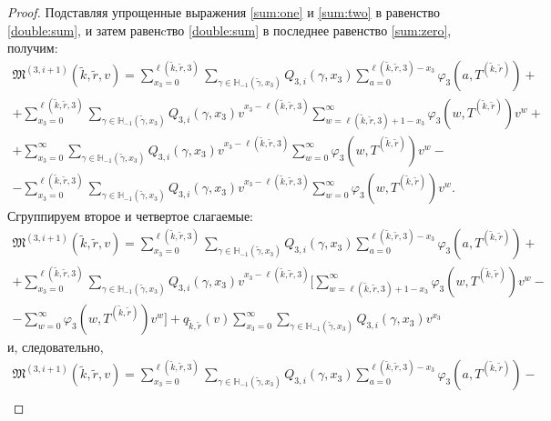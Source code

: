 \documentclass{report}
\begin{document}
\begin{proof}
Подставляя упрощенные выражения \eqref{sum:one} и \eqref{sum:two} в равенство \eqref{double:sum}, и затем равенcтво \eqref{double:sum} в последнее равенство  \eqref{sum:zero}, получим:
\begin{multline*}
\mathfrak{M}^{(3,i+1)}(\tilde{k},\tilde{r},v) = \sum_{x_3=0}^{\ell(\tilde{k},\tilde{r},3)}\sum_{\gamma \in {\mathbb H}_{-1}(\tilde{\gamma},x_3)} Q_{3,i}(\gamma,x_3) \sum_{a=0}^{\ell(\tilde{k},\tilde{r},3) - x_3} \varphi_3(a,T^{(\tilde{k},\tilde{r})}) + \\
+ \sum_{x_3=0}^{\ell(\tilde{k},\tilde{r},3)}  \sum_{\gamma \in {\mathbb H}_{-1}(\tilde{\gamma},x_3)} Q_{3,i}(\gamma,x_3) v^{x_3-\ell(\tilde{k},\tilde{r},3)}  \sum_{w=\ell(\tilde{k},\tilde{r},3) + 1 -x_3}^{\infty}
\varphi_3(w,T^{(\tilde{k},\tilde{r})}) v^w + \\
+ \sum_{x_3=0}^{\infty} \sum_{\gamma \in {\mathbb H}_{-1}(\tilde{\gamma},x_3)} Q_{3,i}(\gamma,x_3) v^{x_3-\ell(\tilde{k},\tilde{r},3)}\sum_{w=0}^{\infty} 
\varphi_3(w,T^{(\tilde{k},\tilde{r})}) v^w - \\
- \sum_{x_3=0}^{\ell(\tilde{k},\tilde{r},3)} \sum_{\gamma \in {\mathbb H}_{-1}(\tilde{\gamma},x_3)} Q_{3,i}(\gamma,x_3) v^{x_3-\ell(\tilde{k},\tilde{r},3)}\sum_{w=0}^{\infty}  
\varphi_3(w,T^{(\tilde{k},\tilde{r})}) v^w.
\end{multline*}
Сгруппируем второе и четвертое слагаемые:
\begin{multline*}
\mathfrak{M}^{(3,i+1)}(\tilde{k},\tilde{r},v)= \sum_{x_3=0}^{\ell(\tilde{k},\tilde{r},3)}\sum_{\gamma \in {\mathbb H}_{-1}(\tilde{\gamma},x_3)} Q_{3,i}(\gamma,x_3) \sum_{a=0}^{\ell(\tilde{k},\tilde{r},3) - x_3} \varphi_3(a,T^{(\tilde{k},\tilde{r})}) + \\
+ \sum_{x_3=0}^{\ell(\tilde{k},\tilde{r},3)}  \sum_{\gamma \in {\mathbb H}_{-1}(\tilde{\gamma},x_3)} Q_{3,i}(\gamma,x_3) v^{x_3-\ell(\tilde{k},\tilde{r},3)}  [ \sum_{w=\ell(\tilde{k},\tilde{r},3) + 1 -x_3}^{\infty}
\varphi_3(w,T^{(\tilde{k},\tilde{r})}) v^w -\\-\sum_{w=0}^{\infty} 
\varphi_3(w,T^{(\tilde{k},\tilde{r})}) v^w ] 
+ q_{\tilde{k},\tilde{r}}(v) \sum_{x_3=0}^{\infty} \sum_{\gamma \in {\mathbb H}_{-1}(\tilde{\gamma},x_3)} Q_{3,i}(\gamma,x_3) v^{x_3}
\end{multline*}
и, следовательно,
\begin{multline}
\mathfrak{M}^{(3,i+1)}(\tilde{k},\tilde{r},v)= \sum_{x_3=0}^{\ell(\tilde{k},\tilde{r},3)}\sum_{\gamma \in {\mathbb H}_{-1}(\tilde{\gamma},x_3)} Q_{3,i}(\gamma,x_3) \sum_{a=0}^{\ell(\tilde{k},\tilde{r},3) - x_3} \varphi_3(a,T^{(\tilde{k},\tilde{r})}) - \\

\end{multline}
\end{proof}
\end{document}
